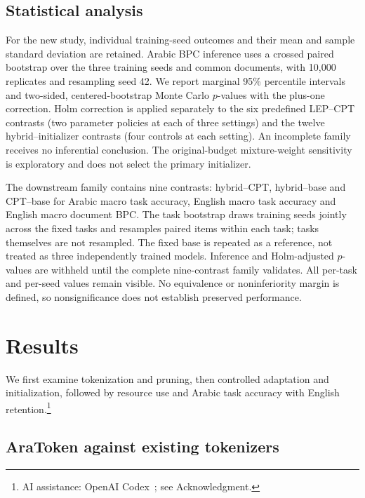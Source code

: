 \documentclass{ieeeaccess}
\begin{document}
\subsection{Statistical analysis}

For the new study, individual training-seed outcomes and their mean and sample standard deviation are retained. Arabic BPC inference uses a crossed paired bootstrap \cite{efron1979bootstrap} over the three training seeds and common documents, with 10{,}000 replicates and resampling seed 42. We report marginal 95\% percentile intervals and two-sided, centered-bootstrap Monte Carlo $p$-values with the plus-one correction. Holm correction \cite{holm1979simple} is applied separately to the six predefined LEP--CPT contrasts (two parameter policies at each of three settings) and the twelve hybrid--initializer contrasts (four controls at each setting). An incomplete family receives no inferential conclusion. The original-budget mixture-weight sensitivity is exploratory and does not select the primary initializer.

The downstream family contains nine contrasts: hybrid--CPT, hybrid--base and CPT--base for Arabic macro task accuracy, English macro task accuracy and English macro document BPC. The task bootstrap draws training seeds jointly across the fixed tasks and resamples paired items within each task; tasks themselves are not resampled. The fixed base is repeated as a reference, not treated as three independently trained models. Inference and Holm-adjusted $p$-values are withheld until the complete nine-contrast family validates. All per-task and per-seed values remain visible. No equivalence or noninferiority margin is defined, so nonsignificance does not establish preserved performance.

\section{Results}
\label{sec:results}

We first examine tokenization and pruning, then controlled adaptation and
initialization, followed by resource use and Arabic task accuracy with
English retention.\footnote{AI assistance: OpenAI Codex~\cite{openaicodex2026}; see Acknowledgment.}

\subsection{AraToken against existing tokenizers}
\label{sec:res_tokenizers}
\end{document}
